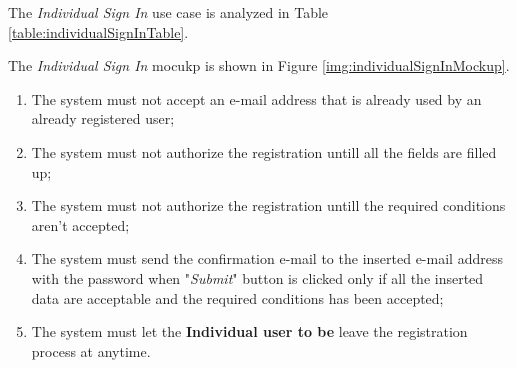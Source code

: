 The \textit{Individual Sign In} use case is analyzed in Table \ref{table:individualSignInTable}.

The \textit{Individual Sign In} mocukp is shown in Figure \ref{img:individualSignInMockup}.

\begin{enumerate}
  \item The system must not accept an e-mail address that is already used by an already registered user;
  \item The system must not authorize the registration untill all the fields are filled up;
  \item The system must not authorize the registration untill the required conditions aren't accepted;
  \item The system must send the confirmation e-mail to the inserted e-mail address with the password when "\textit{Submit}" button is clicked only if all the inserted data are acceptable and the required conditions has been accepted;
  \item The system must let the \textbf{Individual user to be} leave the registration process at anytime.
\end{enumerate}

